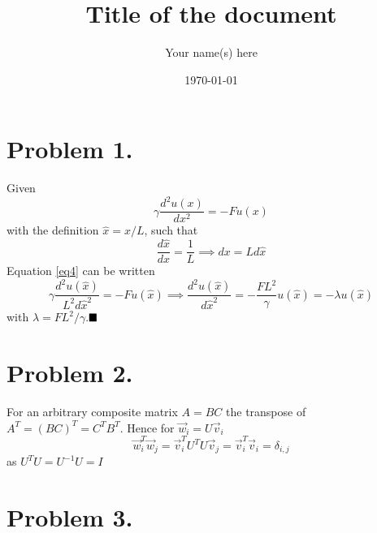 \documentclass[english,notitlepage]{revtex4-1}  %
\begin{document}
\title{Title of the document}      %
\author{Your name(s) here}          %
\date{\today}                             %
\noaffiliation                            %


\maketitle 
    

\section*{Problem 1.}
    Given
    \begin{equation}
            \gamma \frac{d^2 u(x)}{d x^2}
        =   -Fu(x)
        \label{eq4}
    \end{equation}
    with the definition $\hat{x} = x/L$, such that
    \begin{equation*}
            \frac{d\hat{x}}{d x}
        =   \frac{1}{L}
        \implies 
            dx
        =   L d\hat{x}
    \end{equation*}
    Equation \ref{eq4} can be written
    \begin{equation*}
            \gamma \frac{d^2 u(\hat{x})}{L^2 d\hat{x}^2}
        =   -Fu(\hat{x})
        \implies
            \frac{d^2 u(\hat{x})}{d \hat{x}^2}
        =   -\frac{FL^2}{\gamma}u(\hat{x})
        =   -\lambda u(\hat{x})
    \end{equation*}
    with $\lambda = FL^2/\gamma$.$\hfill\blacksquare$


\section*{Problem 2.}
    For an arbitrary composite matrix $A = BC$ the transpose of $A^T = (BC)^T = C^TB^T$.
    Hence for $\vec{w}_i = U\vec{v}_i$
    \begin{equation*}
            \vec{w}^T_i\vec{w}_j
        =   \vec{v}^T_iU^TU\vec{v}_j
        =   \vec{v}^T_i\vec{v}_i
        =   \delta_{i,j}
    \end{equation*}
    as $U^TU = U^{-1}U = I$


\section*{Problem 3.}
\end{document}
